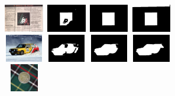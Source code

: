 \documentclass[10pt,twocolumn,letterpaper]{article}
\begin{document}
\begin{figure}[t]
\begin{center}
    \includegraphics[width=0.7in,height=0.48in]{./Figures/Lambda/5_145_145612.jpg}
    \includegraphics[width=0.7in,height=0.48in]{./Figures/Lambda/5_145_145612_2.jpg}
    \includegraphics[width=0.7in,height=0.48in]{./Figures/Lambda/5_145_145612_3.jpg} 
    \includegraphics[width=0.7in,height=0.48in]{./Figures/Lambda/5_145_145612_4.jpg} \\
    \includegraphics[width=0.7in,height=0.48in]{./Figures/Lambda/5_154_154292.jpg}
    \includegraphics[width=0.7in,height=0.48in]{./Figures/Lambda/5_154_154292_2.jpg}
    \includegraphics[width=0.7in,height=0.48in]{./Figures/Lambda/5_154_154292_3.jpg} 
    \includegraphics[width=0.7in,height=0.48in]{./Figures/Lambda/5_154_154292_4.jpg} \\
    \includegraphics[width=0.7in,height=0.48in]{./Figures/Lambda/5_154_154732.jpg}

\end{center}
\end{figure}
\end{document}
